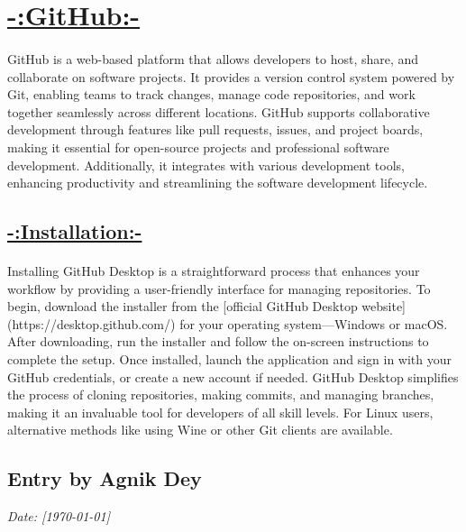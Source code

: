 \documentclass[a4paper,12pt]{article}
\begin{document}
\section*{\Huge{\underline{{-:GitHub:-}}}}
\paragraph{}{GitHub is a web-based platform that allows developers to host, share, and collaborate on software projects. It provides a version control system powered by Git, enabling teams to track changes, manage code repositories, and work together seamlessly across different locations. GitHub supports collaborative development through features like pull requests, issues, and project boards, making it essential for open-source projects and professional software development. Additionally, it integrates with various development tools, enhancing productivity and streamlining the software development lifecycle.}

\subsection*{\underline{-:Installation:-}}
\paragraph{}{Installing GitHub Desktop is a straightforward process that enhances your workflow by providing a user-friendly interface for managing repositories. To begin, download the installer from the [official GitHub Desktop website](https://desktop.github.com/) for your operating system—Windows or macOS. After downloading, run the installer and follow the on-screen instructions to complete the setup. Once installed, launch the application and sign in with your GitHub credentials, or create a new account if needed. GitHub Desktop simplifies the process of cloning repositories, making commits, and managing branches, making it an invaluable tool for developers of all skill levels. For Linux users, alternative methods like using Wine or other Git clients are available.}


\newpage
{}
\vspace{-2cm}
\subsection*{Entry by Agnik Dey}
\textit{Date: [\today]}\\
\end{document}
